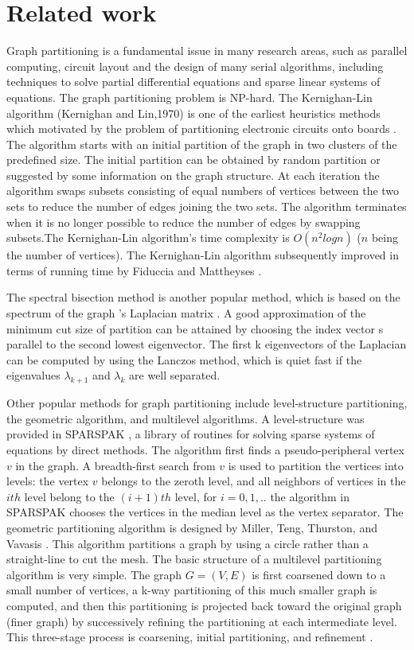 \documentclass{acm_proc_article-sp}
\begin{document}
\section{Related work}
Graph partitioning is a fundamental issue in many research areas, such as parallel computing, circuit layout and the design of many serial algorithms, including techniques to solve partial differential equations and sparse linear systems of equations. The graph partitioning problem is NP-hard. The Kernighan-Lin algorithm (Kernighan and Lin,1970) is one of the earliest heuristics methods which motivated by the problem of partitioning electronic circuits onto boards \cite{kl:partition}. The algorithm starts with an initial partition of the graph in two clusters of the predefined size. The initial partition can be obtained by random partition or suggested by some information on the graph structure. At each iteration the algorithm swaps subsets consisting of equal numbers of vertices between the two sets to reduce the number of edges joining the two sets. The algorithm terminates when it is no longer possible to reduce the number of edges by swapping subsets.The Kernighan-Lin algorithm's time complexity is $O(n^{2}log n)$ ($n$ being the number of vertices). The Kernighan-Lin algorithm subsequently improved in terms of running time by Fiduccia and Mattheyses \cite{1585498}.
\par
The spectral bisection method is another popular method, which is based on the spectrum of the graph 's Laplacian matrix \cite{barnard:mrsb}. A good approximation of the minimum cut size of partition can be attained by choosing the index vector s parallel to the second lowest eigenvector. The first k eigenvectors of the Laplacian can be computed by using the Lanczos method, which is quiet fast if the eigenvalues $\lambda_{k+1}$ and $\lambda_{k}$ are well separated.
\par
Other popular methods for graph partitioning include level-structure partitioning, the geometric algorithm, and multilevel algorithms. A level-structure was provided in SPARSPAK \cite{tech:sparspak}, a library of routines for solving sparse systems of equations by direct methods. The algorithm first finds a pseudo-peripheral vertex $v$ in the graph. A breadth-first search from $v$ is used to partition the vertices into levels: the vertex $v$ belongs to the zeroth level, and all neighbors of vertices in the $ith$ level belong to the $(i + 1)th$ level, for $i = 0, 1,..$ the algorithm in SPARSPAK chooses the vertices in the median level as the vertex separator. The geometric partitioning algorithm is designed by Miller, Teng, Thurston, and Vavasis \cite{Gary:amp}. This algorithm partitions a graph by using a circle rather than a straight-line to cut the mesh. The basic structure of a multilevel partitioning algorithm is very simple. The graph $G =(V, E)$ is first coarsened down to a small number of vertices, a k-way partitioning of this much smaller graph is computed, and then this partitioning is projected back toward the original graph (finer graph) by successively refining the partitioning at each intermediate level. This three-stage process is coarsening, initial partitioning, and refinement \cite{karypis:multi1}.
\end{document}
